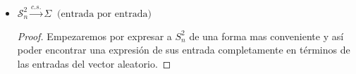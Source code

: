 \documentclass[letterpaper]{article}
\theoremstyle{definition}
\theoremstyle{lemathm}
\theoremstyle{lemademthm}
\newcommand{\pars}[1]{\left( #1 \right) }
\newcommand{\1}{\mathbbm{1}}
\begin{document}
\begin{enumerate}
\begin{itemize}
\begin{proof}
                \[\sqrt{n}\pars{\vec{Y_n}-\mu}a^t \overset{d}{\to} N\pars{0,a\Sigma a^t},\]
                
                por lo tanto
                
                \[\phi_{\vec{Y}_n}(a) \to \phi_{N\pars{0,\Sigma}}(a),\]
                
                por el teorema 9.1 concluimos que
                
                \[\vec{Y}_n \sim N\pars{0,\sigma}.\]
                
            \end{proof}
            
            \newpage
            
            \item $\mathcal{S}_n^2\overset{c.s.}{\to} \Sigma\ \text{ (entrada por entrada)}$
            
            \begin{proof}
            
                Empezaremos por expresar a $S_n^2$ de una forma mas conveniente y así poder encontrar una expresión de sus entrada completamente en términos de las entradas del vector aleatorio.
                

\end{proof}
\end{itemize}
\end{enumerate}
\end{document}
